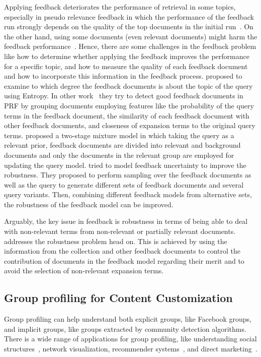 Applying feedback deteriorates the performance of retrieval in some topics, especially in pseudo relevance feedback in which the performance of the feedback run strongly depends on the quality of the top documents in the initial run~\citep{Harman:2009,Collins-Thompson:2009}. 
On the other hand, using some documents (even relevant documents) might harm the feedback performance~\citep{Terra:2005,Lv:2009:CIKM}.  
Hence, there are some challenges in the feedback problem like how to determine whether applying the feedback improves the performance for a specific topic, and how to measure the quality of each feedback document and how to incorporate this information in the feedback process.
%
\citet{He:2009:CIKM} proposed to examine to which degree the feedback documents is about the topic of the query using Entropy. In other work~\citep{He:2009:ECIR} they try to detect good feedback documents in PRF by grouping documents employing features like the probability of the query terms in the feedback document, the similarity of each feedback document with other feedback documents, and closeness of expansion terms to the original query terms. 
\citet{Tao:2004} proposed a two-stage mixture model in which taking the query as a relevant prior, feedback documents are divided into relevant and background documents and only the documents in the relevant group are employed for updating the query model. 
\citet{Collins-Thompson:2007} tried to model feedback uncertainty to improve the robustness. They proposed to perform sampling over the feedback documents as well as the query to generate different sets of feedback documents and several query variants. Then, combining different feedback models from alternative sets, the robustness of the feedback model can be improved.

\medskip
Arguably, the key issue in feedback is robustness in terms of being able to deal with non-relevant terms from non-relevant or partially relevant documents. \acswlm addresses the robustness problem head on. This is achieved by using the information from the collection and other feedback documents to control the contribution of documents in the feedback model regarding their merit and to avoid the selection of non-relevant expansion terms.

\subsection{Group profiling for Content Customization}
Group profiling can help understand both explicit groups, like Facebook groups, and implicit groups, like groups extracted by community detection algorithms. There is a wide range of applications for group profiling, like understanding social structures~\citep{Tang:2011}, network visualization, recommender systems~\citep{Hu:2014,Shang:2014,Amer-Yahia}, and direct marketing~\citep{Custers:2003}. 

